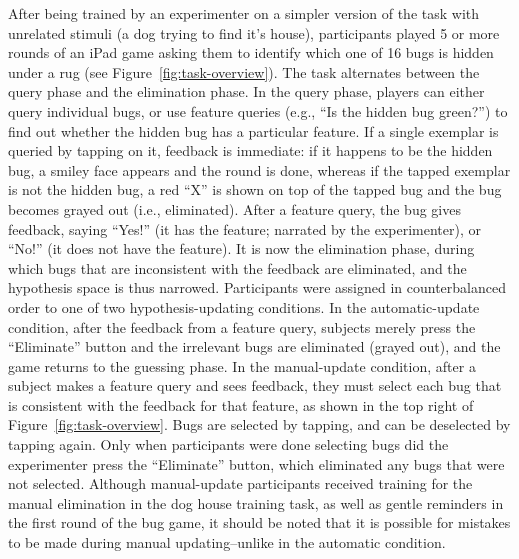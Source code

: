 \documentclass[10pt,letterpaper]{article}
\begin{document}
After being trained by an experimenter on a simpler version of the task with unrelated stimuli (a dog trying to find it's house), participants played 5 or more rounds of an iPad game asking them to identify which one of 16 bugs is hidden under a rug (see Figure~\ref{fig:task-overview}). The task alternates between the query phase and the elimination phase. In the query phase, players can either query individual bugs, or use feature queries (e.g., ``Is the hidden bug green?'') to find out whether the hidden bug has a particular feature. If a single exemplar is queried by tapping on it, feedback is immediate: if it happens to be the hidden bug, a smiley face appears and the round is done, whereas if the tapped exemplar is not the hidden bug, a red ``X'' is shown on top of the tapped bug and the bug becomes grayed out (i.e., eliminated). After a feature query, the bug gives feedback, saying ``Yes!'' (it has the feature; narrated by the experimenter), or ``No!'' (it does not have the feature). It is now the elimination phase, during which bugs that are inconsistent with the feedback are eliminated, and the hypothesis space is thus narrowed. Participants were assigned in counterbalanced order to one of two hypothesis-updating conditions. In the automatic-update condition, after the feedback from a feature query, subjects merely press the ``Eliminate'' button and the irrelevant bugs are eliminated (grayed out), and the game returns to the guessing phase. In the manual-update condition, after a subject makes a feature query and sees feedback, they must select each bug that is consistent with the feedback for that feature, as shown in the top right of Figure~\ref{fig:task-overview}. Bugs are selected by tapping, and can be deselected by tapping again. Only when participants were done selecting bugs did the experimenter press the ``Eliminate'' button, which eliminated any bugs that were not selected. Although manual-update participants received training for the manual elimination in the dog house training task, as well as gentle reminders in the first round of the bug game, it should be noted that it is possible for mistakes to be made during manual updating--unlike in the automatic condition.
\end{document}
